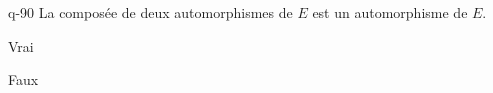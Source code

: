 \begin{truefalse}{q-90}
La composée de deux automorphismes de $E$ est un automorphisme de $E$.
\item* Vrai
\item Faux
\end{truefalse}

